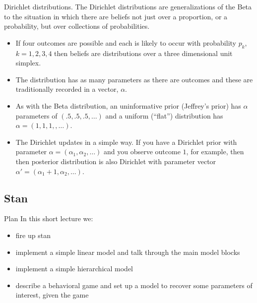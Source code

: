 \documentclass[
  11pt,
  ignorenonframetext,
]{beamer}
\providecommand{\tightlist}{%
  \setlength{\itemsep}{0pt}\setlength{\parskip}{0pt}}\usepackage{longtable,booktabs,array}
\begin{document}
\begin{frame}{Dirichlet distributions.}
\protect\hypertarget{dirichlet-distributions.}{}
The Dirichlet distributions are generalizations of the Beta to the
situation in which there are beliefs not just over a proportion, or a
probability, but over collections of probabilities.

\begin{itemize}
\item
  If four outcomes are possible and each is likely to occur with
  probability \(p_k\), \(k=1,2,3,4\) then beliefs are distributions over
  a three dimensional unit simplex.
\item
  The distribution has as many parameters as there are outcomes and
  these are traditionally recorded in a vector, \(\alpha\).
\item
  As with the Beta distribution, an uninformative prior (Jeffrey's
  prior) has \(\alpha\) parameters of \((.5,.5,.5, \dots)\) and a
  uniform (``flat'') distribution has \(\alpha = (1,1,1,,\dots)\).
\item
  The Dirichlet updates in a simple way. If you have a Dirichlet prior
  with parameter \(\alpha = (\alpha_1, \alpha_2, \dots)\) and you
  observe outcome \(1\), for example, then then posterior distribution
  is also Dirichlet with parameter vector
  \(\alpha' = (\alpha_1+1, \alpha_2,\dots)\).
\end{itemize}
\end{frame}

\hypertarget{stan}{%
\subsection{Stan}\label{stan}}

\begin{frame}{Plan}
\protect\hypertarget{plan-1}{}
In this short lecture we:

\begin{itemize}
\tightlist
\item
  fire up stan
\item
  implement a simple linear model and talk through the main model blocks
\item
  implement a simple hierarchical model
\item
  describe a behavioral game and set up a model to recover some
  parameters of interest, given the game
\end{itemize}
\end{frame}
\end{document}
